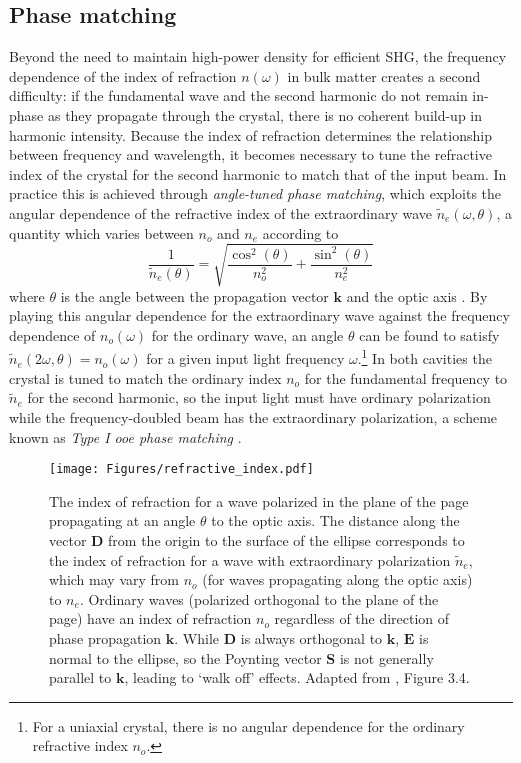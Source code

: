 \documentclass [10pt, twoside] {uwthesis}[2012/04/02]
\begin{document}
\subsection{Phase matching}
Beyond the need to maintain high-power density for efficient SHG, the frequency dependence of the index of refraction $n(\omega)$ in bulk matter creates a second difficulty: if the fundamental wave and the second harmonic do not remain in-phase as they propagate through the crystal, there is no coherent build-up in harmonic intensity. Because the index of refraction determines the relationship between frequency and wavelength, it becomes necessary to tune the refractive index of the crystal for the second harmonic to match that of the input beam. In practice this is achieved through \textit{angle-tuned phase matching}, which exploits the angular dependence of the refractive index of the extraordinary wave $\tilde{n}_e(\omega,\theta)$, a quantity which varies between $n_o$ and $n_e$ according to
\begin{equation}
\dfrac{1}{\tilde{n}_e(\theta)} = \sqrt{\dfrac{\cos^2(\theta)}{n_o^2} + \dfrac{\sin^2(\theta)}{n_e^2}}
\end{equation}
where $\theta$ is the angle between the propagation vector $\mathbf{k}$ and the optic axis \cite{New}. By playing this angular dependence for the extraordinary wave against the frequency dependence of $n_o(\omega)$ for the ordinary wave, an angle $\theta$ can be found to satisfy
$\tilde{n}_e(2\omega,\theta) = n_o(\omega)$ for a given input light frequency $\omega$.\footnote{For a uniaxial crystal, there is no angular dependence for the ordinary refractive index $n_o$.} In both cavities the crystal is tuned to match the ordinary index $n_o$ for the fundamental frequency to $\tilde{n}_e$ for the second harmonic, so the input light must have ordinary polarization while the frequency-doubled beam has the extraordinary polarization, a scheme known as \textit{Type I ooe phase matching} \cite{Swallows}. 

\begin{figure}
\begin{center}
\texttt{[image: Figures/refractive\_index.pdf]}
\end{center}
\caption[Refractive index ellipsoid section in negative uniaxial medium]
{\narrower The index of refraction for a wave polarized in the plane of the page propagating at an angle $\theta$ to the optic axis. The distance along the vector $\mathbf{D}$ from the origin to the surface of the ellipse corresponds to the index of refraction for a wave with extraordinary polarization $\tilde{n}_e$, which may vary from $n_o$ (for waves propagating along the optic axis) to $n_e$. Ordinary waves (polarized orthogonal to the plane of the page) have an index of refraction $n_o$ regardless of the direction of phase propagation $\mathbf{k}$. While $\mathbf{D}$ is always orthogonal to $\mathbf{k}$, $\mathbf{E}$ is normal to the ellipse, so the Poynting vector $\mathbf{S}$ is not generally parallel to $\mathbf{k}$, leading to `walk off' effects. Adapted from \cite{New}, Figure 3.4.}
\label{IndexDiagram}
\end{figure}
\end{document}

